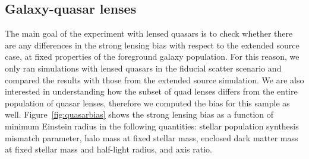 \documentclass{aa}
\def\Fref#1{Figure~\ref{#1}\xspace}
\begin{document}
\subsection{Galaxy-quasar lenses}

The main goal of the experiment with lensed quasars is to check whether there are any differences in the strong lensing bias with respect to the extended source case, at fixed properties of the foreground galaxy population.
For this reason, we only ran simulations with lensed quasars in the fiducial scatter scenario and compared the results with those from the extended source simulation.
We are also interested in understanding how the subset of quad lenses differs from the entire population of quasar lenses, therefore we computed the bias for this sample as well.
\Fref{fig:quasarbias} shows the strong lensing bias as a function of minimum Einstein radius in the following quantities: stellar population synthesis mismatch parameter, halo mass at fixed stellar mass, enclosed dark matter mass at fixed stellar mass and half-light radius, and axis ratio.
\end{document}
